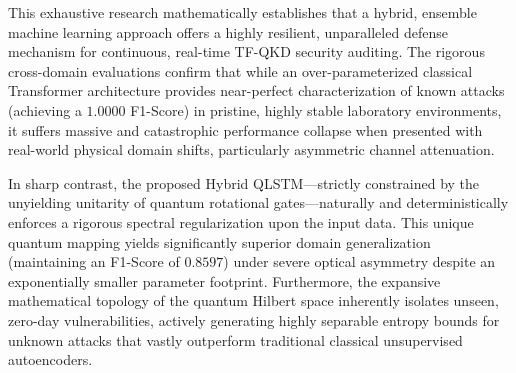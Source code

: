 \documentclass[10pt, journal, letterpaper, twocolumn]{IEEEtran}
\begin{document}
This exhaustive research mathematically establishes that a hybrid, ensemble machine learning approach offers a highly resilient, unparalleled defense mechanism for continuous, real-time TF-QKD security auditing. The rigorous cross-domain evaluations confirm that while an over-parameterized classical Transformer architecture provides near-perfect characterization of known attacks (achieving a $1.0000$ F1-Score) in pristine, highly stable laboratory environments, it suffers massive and catastrophic performance collapse when presented with real-world physical domain shifts, particularly asymmetric channel attenuation.

In sharp contrast, the proposed Hybrid QLSTM—strictly constrained by the unyielding unitarity of quantum rotational gates—naturally and deterministically enforces a rigorous spectral regularization upon the input data. This unique quantum mapping yields significantly superior domain generalization (maintaining an F1-Score of $0.8597$) under severe optical asymmetry despite an exponentially smaller parameter footprint. Furthermore, the expansive mathematical topology of the quantum Hilbert space inherently isolates unseen, zero-day vulnerabilities, actively generating highly separable entropy bounds for unknown attacks that vastly outperform traditional classical unsupervised autoencoders.
\end{document}
